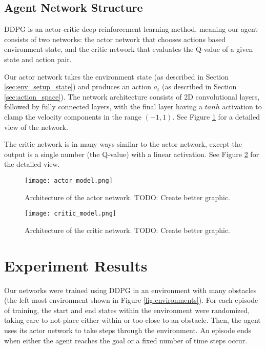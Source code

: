     \subsection{Agent Network Structure}
        DDPG is an actor-critic deep reinforcement learning method, meaning our agent consists
        of two networks: the actor network that chooses actions based environment state, and
        the critic network that evaluates the Q-value of a given state and action pair.

        Our actor network takes the environment state (as described in Section
        \ref{sec:env_setup_state}) and produces an action $a_t$ (as described in Section
        \ref{sec:action_space}). The network architecture consists of 2D convolutional layers,
        followed by fully connected layers, with the final layer having a $tanh$ activation
        to clamp the velocity components in the range $(-1,1)$. See Figure
        \ref{fig:actor_network} for a detailed view of the network.

        The critic network is in many ways similar to the actor network, except the output
        is a single number (the Q-value) with a linear activation. See Figure
        \ref{fig:critic_network} for the detailed view.

        \begin{figure}[H]
            \centering
                \texttt{[image: actor\_model.png]}
                \caption{Architecture of the actor network. TODO: Create better graphic.}
                \label{fig:actor_network}
        \end{figure}        

        \begin{figure}[H]
            \centering
                \texttt{[image: critic\_model.png]}
                \caption{Architecture of the critic network. TODO: Create better graphic.}
                \label{fig:critic_network}
        \end{figure}

    \section{Experiment Results}
        Our networks were trained using DDPG in an environment with many obstacles (the
        left-most environment shown in Figure \ref{fig:environments}). For each episode
        of training, the start and end states within the environment were randomized, taking
        care to not place either within or too close to an obstacle. Then, the agent
        uses its actor network to take steps through the environment. An episode ends when
        either the agent reaches the goal or a fixed number of time steps occur.


